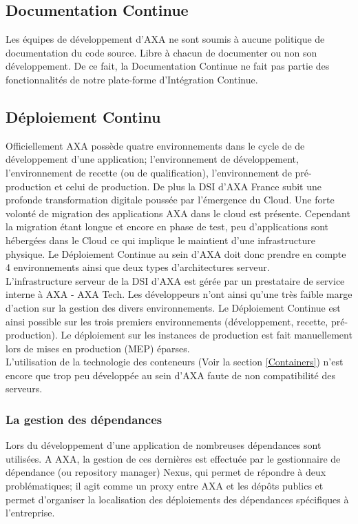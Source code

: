     \subsection{Documentation Continue}
    Les équipes de développement d'AXA ne sont soumis à aucune politique de documentation du code source. Libre à chacun de documenter ou non son développement. De ce fait, la Documentation Continue ne fait pas partie des fonctionnalités de notre plate-forme d'Intégration Continue.

    \subsection{Déploiement Continu}
    Officiellement AXA possède quatre environnements dans le cycle de de développement d'une application; l'environnement de développement, l'environnement de recette (ou de qualification), l'environnement de pré-production et celui de production. De plus la DSI d'AXA France subit une profonde transformation digitale poussée par l'émergence du Cloud. Une forte volonté de migration des applications AXA dans le cloud est présente. Cependant la migration étant longue et encore en phase de test, peu d'applications sont hébergées dans le Cloud ce qui implique le maintient d'une infrastructure physique. Le Déploiement Continue au sein d'AXA doit donc prendre en compte 4 environnements ainsi que deux types d'architectures serveur.\\

    L'infrastructure serveur de la DSI d'AXA est gérée par un prestataire de service interne à AXA - AXA Tech. Les développeurs n'ont ainsi qu'une très faible marge d'action sur la gestion des divers environnements. Le Déploiement Continue est ainsi possible sur les trois premiers environnements (développement, recette, pré-production). Le déploiement sur les instances de production est fait manuellement lors de mises en production (MEP) éparses.\\

    L'utilisation de la technologie des conteneurs (Voir la section \ref{Containers}) n'est encore que trop peu développée au sein d'AXA faute de non compatibilité des serveurs.

      \subsubsection{La gestion des dépendances}\label{Nexus}
      Lors du développement d'une application de nombreuses dépendances sont utilisées. A AXA, la gestion de ces dernières est effectuée par le gestionnaire de dépendance (ou repository manager) Nexus, qui permet de répondre à deux problématiques; il agit comme un proxy entre AXA et les dépôts publics et permet d'organiser la localisation des déploiements des dépendances spécifiques à l'entreprise.\\


